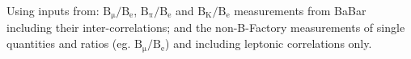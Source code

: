 \noindent Using inputs from: $\mathrm{B_\mu/B_e}$,  $\mathrm{B_\pi/B_e}$ and $\mathrm{B_K/B_e}$ measurements from BaBar including their inter-correlations; and the non-B-Factory measurements of single quantities and ratios (eg. $\mathrm{B_\mu/B_e}$) and including leptonic correlations only.
